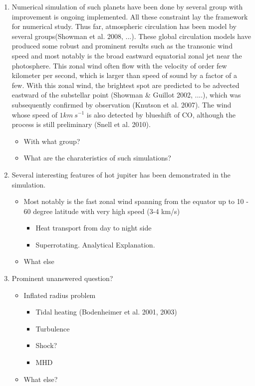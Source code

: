 \documentclass[11pt]{article}
\begin{document}
\begin{enumerate}
\item Numerical simulation of such planets have been done by several group with improvement is ongoing implemented.
All these  constraint lay the framework for numerical study. Thus far, atmospheric circulation has been model by several groups(Showman et al. 2008, ...). These global circulation models have produced some robust and prominent results such as the transonic wind speed and most notably is the broad eastward equatorial zonal jet near the photosphere. This zonal wind often flow with the velocity of order few kilometer per second, which is larger than speed of sound by a factor of a few. With this zonal wind, the brightest spot are predicted to be advected eastward of the substellar point (Showman \& Guillot 2002, ....), which was subsequently confirmed by observation (Knutson et al. 2007). The wind whose speed of $1km \ s^{-1}$ is also detected by blueshift of CO, although the process is still preliminary (Snell et al. 2010). 

\begin{itemize}
\item With what group?
\item What are the charateristics of such simulations?
\end{itemize}

\item Several interesting features of hot jupiter has been demonstrated in the simulation. 
\begin{itemize}
\item Most notably is the fast zonal wind spanning from the equator up to 10 - 60 degree latitude with very high speed (3-4 km/s) 
\begin{itemize} 
\item Heat transport from day to night side
\item Superrotating. Analytical Explanation. 
\end{itemize}
\item What else
\end{itemize}

\item Prominent unanswered question?
\begin{itemize}
\item Inflated radius problem
\begin{itemize}
\item Tidal heating (Bodenheimer et al. 2001, 2003)
\item Turbulence
\item Shock?
\item MHD
\end{itemize}
\item What else?
\end{itemize}


\end{enumerate}
\end{document}
